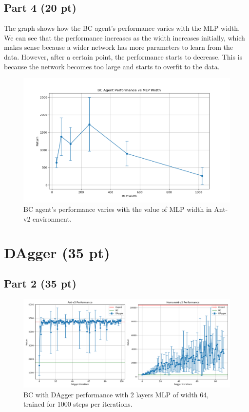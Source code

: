 \documentclass{article}
\begin{document}
\subsection{Part 4 (20 pt)}

The graph shows how the BC agent's performance varies with the MLP width. We can see that the performance increases as the width increases initially, which makes sense because a wider network has more parameters to learn from the data. However, after a certain point, the performance starts to decrease. This is because the network becomes too large and starts to overfit to the data.


\begin{figure}[!h]
	\centering
\includegraphics[width=0.5\columnwidth]{../hw1/rob831/scripts/bc_agent_performance_vs_mlp_width.png}
	\caption{BC agent’s performance varies with the value of MLP width in Ant-v2 environment.}
	\label{fig:p4}
\end{figure}

\section{DAgger (35 pt)}
\subsection{Part 2 (35 pt)}

\begin{figure}[!h]
	\centering
	\includegraphics[width=1.0\columnwidth]{../hw1/rob831/scripts/dagger_performance.png}
	\caption{BC with DAgger performance with 2 layers MLP of width 64, trained for 1000 steps per iterations.}
	\label{fig:p5}
\end{figure}
\end{document}
